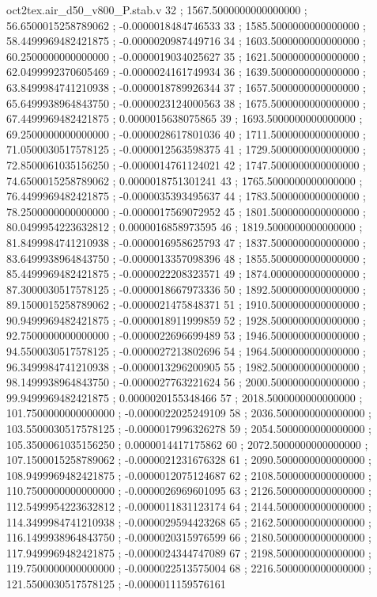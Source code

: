 \begin{filecontents}[overwrite]{oct2tex.air_d50_v800_P.stab.v}
32 ; 1567.5000000000000000 ; 56.6500015258789062 ; -0.0000018484746533
33 ; 1585.5000000000000000 ; 58.4499969482421875 ; -0.0000020987449716
34 ; 1603.5000000000000000 ; 60.2500000000000000 ; -0.0000019034025627
35 ; 1621.5000000000000000 ; 62.0499992370605469 ; -0.0000024161749934
36 ; 1639.5000000000000000 ; 63.8499984741210938 ; -0.0000018789926344
37 ; 1657.5000000000000000 ; 65.6499938964843750 ; -0.0000023124000563
38 ; 1675.5000000000000000 ; 67.4499969482421875 ; 0.0000015638075865
39 ; 1693.5000000000000000 ; 69.2500000000000000 ; -0.0000028617801036
40 ; 1711.5000000000000000 ; 71.0500030517578125 ; -0.0000012563598375
41 ; 1729.5000000000000000 ; 72.8500061035156250 ; -0.0000014761124021
42 ; 1747.5000000000000000 ; 74.6500015258789062 ; 0.0000018751301241
43 ; 1765.5000000000000000 ; 76.4499969482421875 ; -0.0000035393495637
44 ; 1783.5000000000000000 ; 78.2500000000000000 ; -0.0000017569072952
45 ; 1801.5000000000000000 ; 80.0499954223632812 ; 0.0000016858973595
46 ; 1819.5000000000000000 ; 81.8499984741210938 ; -0.0000016958625793
47 ; 1837.5000000000000000 ; 83.6499938964843750 ; -0.0000013357098396
48 ; 1855.5000000000000000 ; 85.4499969482421875 ; -0.0000022208323571
49 ; 1874.0000000000000000 ; 87.3000030517578125 ; -0.0000018667973336
50 ; 1892.5000000000000000 ; 89.1500015258789062 ; -0.0000021475848371
51 ; 1910.5000000000000000 ; 90.9499969482421875 ; -0.0000018911999859
52 ; 1928.5000000000000000 ; 92.7500000000000000 ; -0.0000022696699489
53 ; 1946.5000000000000000 ; 94.5500030517578125 ; -0.0000027213802696
54 ; 1964.5000000000000000 ; 96.3499984741210938 ; -0.0000013296200905
55 ; 1982.5000000000000000 ; 98.1499938964843750 ; -0.0000027763221624
56 ; 2000.5000000000000000 ; 99.9499969482421875 ; 0.0000020155348466
57 ; 2018.5000000000000000 ; 101.7500000000000000 ; -0.0000022025249109
58 ; 2036.5000000000000000 ; 103.5500030517578125 ; -0.0000017996326278
59 ; 2054.5000000000000000 ; 105.3500061035156250 ; 0.0000014417175862
60 ; 2072.5000000000000000 ; 107.1500015258789062 ; -0.0000021231676328
61 ; 2090.5000000000000000 ; 108.9499969482421875 ; -0.0000012075124687
62 ; 2108.5000000000000000 ; 110.7500000000000000 ; -0.0000026969601095
63 ; 2126.5000000000000000 ; 112.5499954223632812 ; -0.0000011831123174
64 ; 2144.5000000000000000 ; 114.3499984741210938 ; -0.0000029594423268
65 ; 2162.5000000000000000 ; 116.1499938964843750 ; -0.0000020315976599
66 ; 2180.5000000000000000 ; 117.9499969482421875 ; -0.0000024344747089
67 ; 2198.5000000000000000 ; 119.7500000000000000 ; -0.0000022513575004
68 ; 2216.5000000000000000 ; 121.5500030517578125 ; -0.0000011159576161

\end{filecontents}
